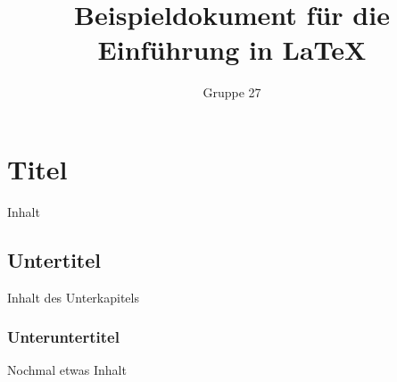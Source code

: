 \documentclass[a4paper,10pt,fleqn]{article}
\title{Beispieldokument für die Einführung in \LaTeX}
\author{Gruppe 27}
\begin{document}
\maketitle
\clearpage
\tableofcontents
\clearpage

\section{Titel}
Inhalt

\subsection{Untertitel}
Inhalt des Unterkapitels

\subsubsection{Unteruntertitel}
Nochmal etwas Inhalt


\end{document}
